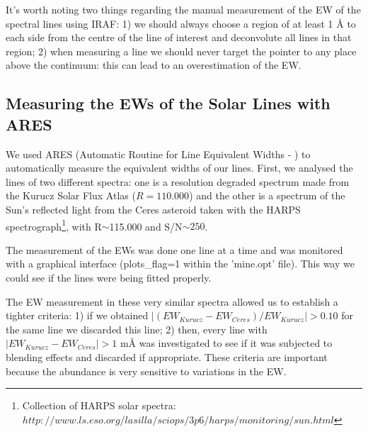\documentclass[dvips,12pt,a4paper]{report}
\begin{document}
{It's worth noting two things regarding the manual measurement of the EW of the spectral lines using IRAF: 1) we should always choose a region of at least 1 \AA{} to each side from the centre of the line of interest and deconvolute all lines in that region; 2) when measuring a line we should never target the pointer to any place above the continuum: this can lead to an overestimation of the EW.%

\subsection {Measuring the EWs of the Solar Lines with ARES}
\label{ARES}
We used ARES (Automatic Routine for Line Equivalent Widths - \citeauthor{Sousa-2007} \citeyear{Sousa-2007}) to automatically measure the equivalent widths of our lines. First, we analysed the lines of two different spectra: one is a resolution degraded spectrum made from the Kurucz Solar Flux Atlas ($R=110.000$) and the other is a spectrum of the Sun's reflected light from the Ceres asteroid taken with the HARPS spectrograph\footnote{Collection of HARPS solar spectra: $http://www.ls.eso.org/lasilla/sciops/3p6/harps/monitoring/sun.html$}, with R$\sim$115.000 and S/N$\sim250$. %



The measurement of the EWs was done one line at a time and was monitored with a graphical interface (plots\_flag=1 within the 'mine.opt' file). This way we could see if the lines were being fitted properly.

The EW measurement in these very similar spectra allowed us to establish a tighter criteria: 1) if we obtained $|(EW_{Kurucz}-EW_{Ceres})/EW_{Kurucz}|>0.10$ for the same line we discarded this line; 2) then, every line with $|EW_{Kurucz}-EW_{Ceres}|>1$ m\AA{} was investigated to see if it was subjected to blending effects and discarded if appropriate. These criteria are important because the abundance is very sensitive to variations in the EW. %

}
\end{document}

